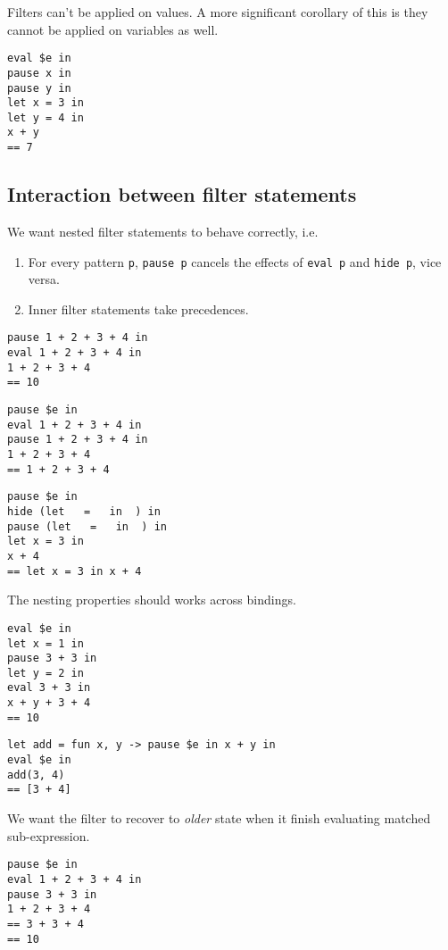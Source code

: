 Filters can't be applied on values. A more significant corollary of this is they cannot be applied on variables as well.
\begin{verbatim}
eval $e in
pause x in
pause y in
let x = 3 in
let y = 4 in
x + y
== 7
\end{verbatim}

\subsection{Interaction between filter statements}


We want nested filter statements to behave correctly, i.e.
\begin{enumerate}
\item For every pattern \verb|p|, \verb|pause p| cancels the effects
  of \verb|eval p| and \verb|hide p|, vice versa.
\item Inner filter statements take precedences.
\end{enumerate}

\begin{verbatim}
pause 1 + 2 + 3 + 4 in
eval 1 + 2 + 3 + 4 in
1 + 2 + 3 + 4
== 10
\end{verbatim}

\begin{verbatim}
pause $e in
eval 1 + 2 + 3 + 4 in
pause 1 + 2 + 3 + 4 in
1 + 2 + 3 + 4
== 1 + 2 + 3 + 4
\end{verbatim}

\begin{verbatim}
pause $e in
hide (let   =   in  ) in
pause (let   =   in  ) in
let x = 3 in
x + 4
== let x = 3 in x + 4
\end{verbatim}

The nesting properties should works across bindings.

\begin{verbatim}
eval $e in
let x = 1 in
pause 3 + 3 in
let y = 2 in
eval 3 + 3 in
x + y + 3 + 4
== 10
\end{verbatim}

\begin{verbatim}
let add = fun x, y -> pause $e in x + y in
eval $e in
add(3, 4)
== [3 + 4]
\end{verbatim}

We want the filter to recover to \emph{older} state when it finish
evaluating matched sub-expression.

\begin{verbatim}
pause $e in
eval 1 + 2 + 3 + 4 in
pause 3 + 3 in
1 + 2 + 3 + 4
== 3 + 3 + 4
== 10
\end{verbatim}

